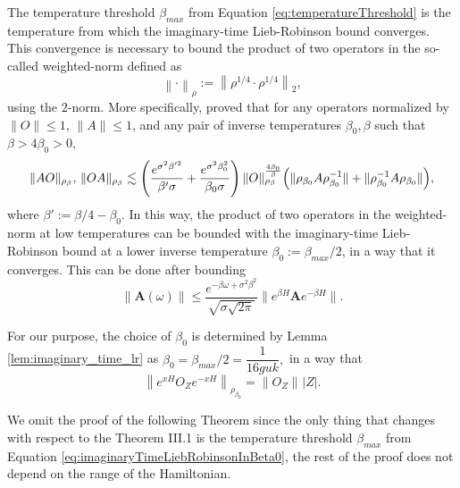 \documentclass[11pt]{article}
\numberwithin{equation}{section}
\numberwithin{figure}{section}
\numberwithin{table}{section}
\theoremstyle{definition}
\theoremstyle{plain}
\theoremstyle{remark}
\newcommand{\vA}{\bm{A}}
\newcommand{\normm}[2]{\left\lVert#1\right\rVert_{#2}}
\newcommand{\abs}[1]{\left \vert#1\right\vert}
\begin{document}
The temperature threshold $\beta_{max}$ from Equation \eqref{eq:temperatureThreshold} is the temperature from which the imaginary-time Lieb-Robinson bound converges. 
This convergence is necessary to bound the product of two operators in the so-called weighted-norm defined as
\begin{equation}
    \normm{\cdot }{\rho}:=\normm{\rho^{1/4}\cdot \rho^{1/4}}{2},
\end{equation}
using the $2$-norm. More specifically, \cite{chen_quantum_2025} proved that for any operators normalized by $\|O\| \le 1$, $\|A\| \le 1$, and any pair of inverse temperatures 
$\beta_0, \beta$ such that $\beta > 4\beta_0 > 0$,
\begin{equation}
    \| AO \|_{\rho_\beta}, \, \| OA \|_{\rho_\beta}
    \lesssim 
    \left(
        \frac{ e^{\sigma^2 \beta'^2} }{ \beta' \sigma }
        + \frac{ e^{\sigma^2 \beta_0^2} }{ \beta_0 \sigma }
    \right)
    \| O \|_{\rho_\beta}^{\frac{4\beta_0}{\beta}}
    \Bigl(
        \| \rho_{\beta_0} A \rho_{\beta_0}^{-1} \|
        + \| \rho_{\beta_0}^{-1} A \rho_{\beta_0} \|
    \Bigr),
\end{equation}
where $\beta' := \beta/4 - \beta_0$. In this way, the product of two operators in the weighted-norm at low temperatures can be bounded with the imaginary-time Lieb-Robinson bound at a lower inverse temperature $\beta_0:=\beta_{max}/2$, in a way that it converges. This can be done after bounding
\begin{equation}
    \| \vA(\omega) \| 
    \le 
    \frac{ e^{ -\beta \omega + \sigma^2 \beta^2 } }{ \sqrt{ \sigma \sqrt{2\pi} } } 
    \bigl\| e^{\beta H} \vA e^{ -\beta H } \bigr\|.
\end{equation}

For our purpose, the choice of $\beta_0$ is determined by Lemma \ref{lem:imaginary_time_lr}
as $\beta_0=\beta_{max}/2=\dfrac{1}{16 guk},$ in a way that
\begin{equation}
\normm{e^{xH}O_Z e^{-xH}}{\rho_{\beta_0}}=\normm{O_Z}{}\abs{Z}.
\label{eq:imaginaryTimeLiebRobinsonInBeta0}
\end{equation}

We omit the proof of the following Theorem since the only thing that changes with respect to the Theorem III.1 \cite{chen_quantum_2025} is the temperature threshold $\beta_{max}$ from Equation \eqref{eq:imaginaryTimeLiebRobinsonInBeta0}, the rest of the proof does not depend on the range of the Hamiltonian. 
\end{document}
